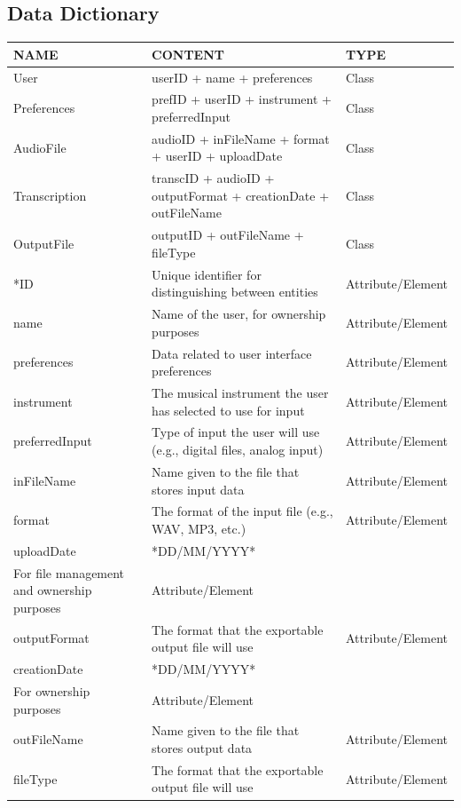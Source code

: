 \documentclass[12pt]{article}
\begin{document}
\subsection{Data Dictionary}
\begingroup
\renewcommand{\arraystretch}{1.25}
\begin{longtable}{|>{\raggedright}p{3cm}|>{\raggedright}p{5.5cm}|>{\raggedright\arraybackslash}p{4cm}|}
  \hline
  NAME & CONTENT & TYPE \\
  \hline
  User & userID + name + preferences & Class\\
  \hline
  Preferences & prefID + userID + instrument + preferredInput & Class \\
  \hline
  AudioFile & audioID + inFileName + format + userID + uploadDate & Class\\
  \hline
  Transcription & transcID + audioID + outputFormat + creationDate + outFileName  & Class \\
  \hline
  OutputFile & outputID + outFileName + fileType  & Class \\
  \hline
  *ID & Unique identifier for distinguishing between entities & Attribute/Element \\
  \hline
  name & Name of the user, for ownership purposes  & Attribute/Element \\
  \hline
  preferences & Data related to user interface preferences  & Attribute/Element \\
  \hline
  instrument & The musical instrument the user has selected to use for input  & Attribute/Element \\
  \hline
  preferredInput & Type of input the user will use (e.g., digital files, analog input)  & Attribute/Element \\
  \hline
  inFileName & Name given to the file that stores input data & Attribute/Element \\
  \hline
  format & The format of the input file (e.g., WAV, MP3, etc.) & Attribute/Element \\
  \hline
  uploadDate & *DD/MM/YYYY*\\ For file management and ownership purposes & Attribute/Element \\
  \hline
  outputFormat & The format that the exportable output file will use & Attribute/Element \\
  \hline
  creationDate & *DD/MM/YYYY*\\For ownership purposes & Attribute/Element \\
  \hline
  outFileName & Name given to the file that stores output data & Attribute/Element \\
  \hline
  fileType & The format that the exportable output file will use & Attribute/Element \\
  \hline
\end{longtable}
\endgroup
\end{document}
